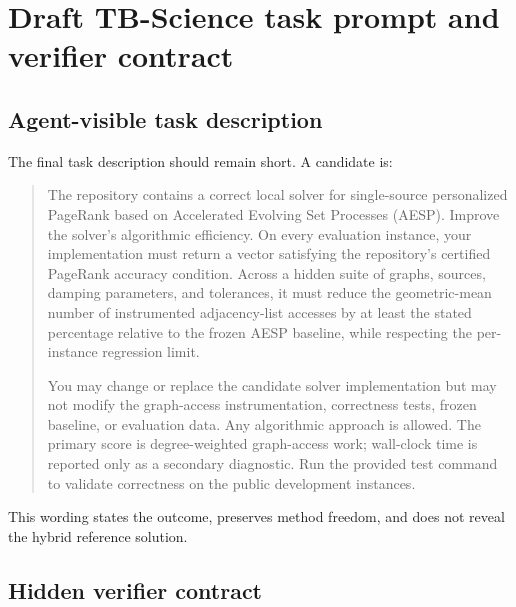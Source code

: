 \section{Draft TB-Science task prompt and verifier contract}
\label{app:task-prompt}

\subsection{Agent-visible task description}

The final task description should remain short.  A candidate is:

\begin{quote}
The repository contains a correct local solver for single-source personalized
PageRank based on Accelerated Evolving Set Processes (AESP).  Improve the
solver's algorithmic efficiency.  On every evaluation instance, your
implementation must return a vector satisfying the repository's certified
PageRank accuracy condition.  Across a hidden suite of graphs, sources,
damping parameters, and tolerances, it must reduce the geometric-mean number
of instrumented adjacency-list accesses by at least the stated percentage
relative to the frozen AESP baseline, while respecting the per-instance
regression limit.

You may change or replace the candidate solver implementation but may not
modify the graph-access instrumentation, correctness tests, frozen baseline,
or evaluation data.  Any algorithmic approach is allowed.  The primary score
is degree-weighted graph-access work; wall-clock time is reported only as a
secondary diagnostic.  Run the provided test command to validate correctness
on the public development instances.
\end{quote}

This wording states the outcome, preserves method freedom, and does not reveal
the hybrid reference solution.

\subsection{Hidden verifier contract}

